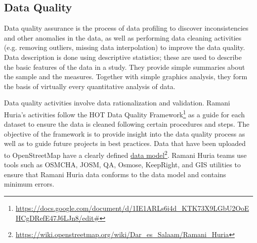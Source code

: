 \documentclass[a4paper,12pt,twoside]{article}
\begin{document}
\subsection{Data Quality}
\begin{multicols}{2}
Data quality assurance is the process of data profiling to discover inconsistencies and other anomalies in the data, as well as performing data cleaning activities (e.g. removing outliers, missing data interpolation) to improve the data quality. Data description is done using descriptive statistics; these are used to describe the basic features of the data in a study. They provide simple summaries about the sample and the measures. Together with simple graphics analysis, they form the basis of virtually every quantitative analysis of data.

Data quality activities involve data rationalization and validation. Ramani Huria's activities follow the HOT Data Quality Framework\footnote{\url{https://docs.google.com/document/d/1IE1ARLs6i4d_KTK73X9LGbU2OoEHCgDRefE47J6LJn8/edit#}} as a guide for each dataset to ensure the data is cleaned following certain procedures and steps. The objective of the framework is to provide insight into the data quality process as well as to guide future projects in best practices. 
Data that have been uploaded to OpenStreetMap have a clearly defined \href{https://wiki.openstreetmap.org/wiki/Dar_es_Salaam/Ramani_Huria}{data model}\footnote{\url{https://wiki.openstreetmap.org/wiki/Dar_es_Salaam/Ramani_Huria}}. Ramani Huria teams use tools such as OSMCHA, JOSM, QA, Osmose, KeepRight, and GIS utilities to ensure that Ramani Huria data conforms to the data model and contains minimum errors.
\end{multicols}
\end{document}
